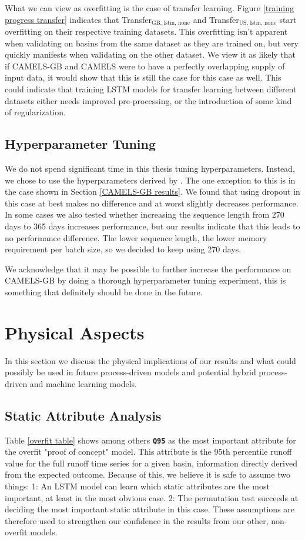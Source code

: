  What we can view as overfitting is the case of transfer learning. Figure 
 \ref{training progress transfer} indicates that Transfer$_\text{GB, lstm, none}$ 
 and Transfer$_\text{US, lstm, none}$ start overfitting on their respective training 
 datasets. This overfitting isn't apparent when validating on basins from the 
 same dataset as they are trained on, but very quickly manifests when validating 
 on the other dataset. We view it as likely that if CAMELS-GB and CAMELS were to 
 have a perfectly overlapping supply of input data, it would show that this is 
 still the case for this case as well. This could indicate that training LSTM models 
 for transfer learning between different datasets either needs improved pre-processing, 
 or the introduction of some kind of regularization. 
\subsection{Hyperparameter Tuning}
We do not spend significant time in this thesis tuning hyperparameters. Instead, 
we chose to use the hyperparameters derived by \citet{lstm_second_paper}. The one 
exception to this is in the case shown in Section \ref{CAMELS-GB results}. We found 
that using dropout in this case at best makes no difference and at worst slightly 
decreases performance. In some cases we also tested whether increasing the 
sequence length from 270 days to 365 days increases performance, but our results 
indicate that this leads to no performance difference. The lower sequence length, 
the lower memory requirement per batch size, so we decided to keep using 270 days. 

We acknowledge that it may be possible to further increase the performance on 
CAMELS-GB by doing a thorough hyperparameter tuning experiment, this is 
something that definitely should be done in the future. 
\section{Physical Aspects}
In this section we discuss the physical implications of our results and what could 
possibly be used in future process-driven models and potential hybrid process-driven 
and machine learning models.
\subsection{Static Attribute Analysis}
\label{discuss static attributes}
Table \ref{overfit table} shows among others \textbf{\texttt{Q95}} as the most 
important attribute for the overfit "proof of concept" model. This attribute is the 
95th percentile runoff value for the full runoff time series for a given basin, 
information directly derived from the expected outcome. 
Because of this, we believe it is 
safe to assume two things: 1: An LSTM model can learn which static attributes are 
the most important, at least in the most obvious case. 2: The permutation test 
succeeds at deciding the most important static attribute in this case. These 
assumptions are therefore used to strengthen our confidence in the results from 
our other, non-overfit models. 

